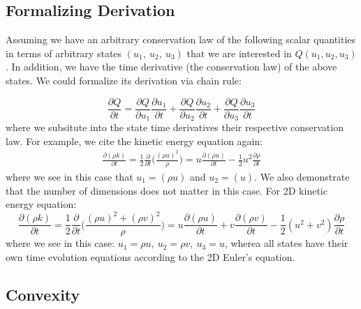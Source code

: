 \documentclass[a4paper]{article}
\numberwithin{equation}{section}
\begin{document}
\subsection{Formalizing Derivation}
Assuming we have an arbitrary conservation law of the following scalar quantities in terms of arbitrary states $(u_1,\ u_2, \ u_3)$ that we are interested in $Q(u_1,u_2,u_3)$. In addition, we have the time derivative (the conservation law) of the above states. We could formalize its derivation via chain rule:

\begin{equation}
    \frac{\partial Q}{\partial t} = \frac{\partial Q}{\partial u_1} \frac{\partial u_1}{\partial t} + \frac{\partial Q}{\partial u_2} \frac{\partial u_2}{\partial t} + \frac{\partial Q}{\partial u_3}\frac{\partial u_3}{\partial t}
\end{equation}
where we subsitute into the state time derivatives their respective conservation law. For example, we cite the kinetic energy equation again:
\begin{equation}
    \begin{split}
        \frac{\partial (\rho k)}{\partial t} = \frac{1}{2} \frac{\partial}{\partial t}\biggl(\frac{(\rho u)^2}{\rho} \biggr) = u \frac{\partial \left(\rho u \right) }{\partial t}  - \frac{1}{2} u^2 \frac{\partial \rho}{\partial t}
    \end{split}
\end{equation}
where we see in this case that $u_1 = \left(\rho u \right)$ and $u_2 = \left(u\right)$. We also demonstrate that the number of dimensions does not matter in this case. For 2D kinetic energy equation: 
\begin{equation}
    \frac{\partial (\rho k)}{\partial t} = \frac{1}{2} \frac{\partial}{\partial t}\biggl(\frac{(\rho u)^2 + (\rho v)^2}{\rho} \biggr) = u \frac{\partial \left(\rho u \right) }{\partial t} + v \frac{\partial (\rho v)}{\partial t} - \frac{1}{2} (u^2 + v^2) \frac{\partial \rho}{\partial t}
\end{equation}
where we see in this case: $u_1 = \rho u, \ u_2 = \rho v, \ u_3 = u $, wherea all states have their own time evolution equations according to the 2D Euler's equation. 
\subsection{Convexity}
\end{document}
